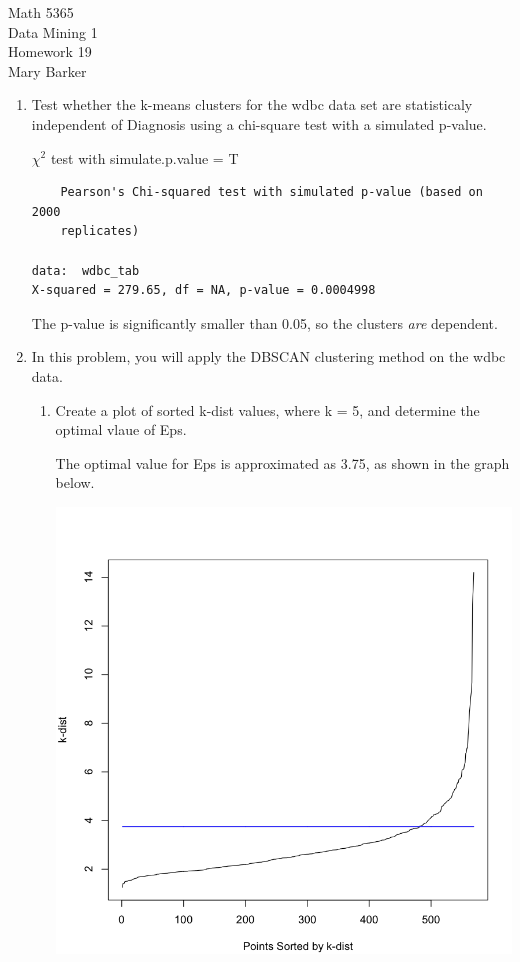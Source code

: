 \documentclass[11pt]{article}
\begin{document}
\noindent\large{Math 5365}\\
\large{Data Mining 1}\\
\large{Homework 19}\\
\large{Mary Barker}
\doublespace
\begin{enumerate}
\item 
 Test whether the k-means clusters for the wdbc data set are 
 statisticaly independent of Diagnosis using a chi-square test with 
 a simulated p-value.

$\chi^2$ test with simulate.p.value = T
\begin{Verbatim}
	Pearson's Chi-squared test with simulated p-value (based on 2000
	replicates)

data:  wdbc_tab
X-squared = 279.65, df = NA, p-value = 0.0004998
\end{Verbatim}

The p-value is significantly smaller than 0.05, so the clusters 
\textit{are} dependent.

\item
 In this problem, you will apply the DBSCAN clustering method on the 
 wdbc data. 

\begin{enumerate}
\item 
 Create a plot of sorted k-dist values, where k = 5, and determine 
 the optimal vlaue of Eps. 


The optimal value for Eps is approximated as 3.75, as shown in the graph below.
\begin{center}
\includegraphics[scale=0.35]{pix/k_dist1}
\end{center}


\end{enumerate}
\end{enumerate}
\end{document}
